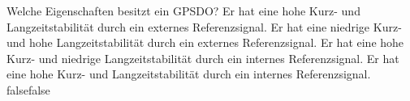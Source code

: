     {Welche Eigenschaften besitzt ein GPSDO?}
    {Er hat eine hohe Kurz- und Langzeitstabilität durch ein externes Referenzsignal.}
    {Er hat eine niedrige Kurz- und hohe Langzeitstabilität durch ein externes Referenzsignal.}
    {Er hat eine hohe Kurz- und niedrige Langzeitstabilität durch ein internes Referenzsignal.}
    {Er hat eine hohe Kurz- und Langzeitstabilität durch ein internes Referenzsignal.}
    {false}{false}